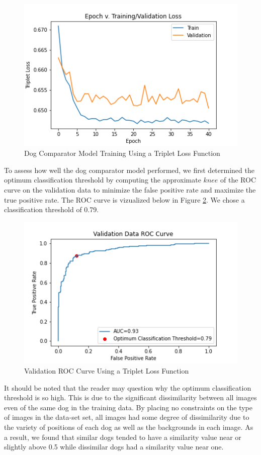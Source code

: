 \documentclass{article}
\begin{document}
\begin{enumerate}
\begin{figure}[h]
\centering
	\includegraphics[scale=0.7]{final-report-images/triplet_training.png}
\caption{Dog Comparator Model Training Using a Triplet Loss Function}
\label{fig:x epoch_v_map}
\end{figure}
To assess how well the dog comparator model performed, we first determined the optimum classification threshold by computing the approximate $knee$ of the ROC curve on the validation data to minimize the false positive rate and maximize the true positive rate.  The ROC curve is vizualized below in Figure \ref{fig:x val roc curve}.  We chose a classification threshold of 0.79.

\begin{figure}[h]
\centering
	\includegraphics[scale=0.7]{final-report-images/roc_curve_validation_triplet.png}
\caption{Validation ROC Curve Using a Triplet Loss Function}
\label{fig:x val roc curve}
\end{figure}

\noindent It should be noted that the reader may question why the optimum classification threshold is so high.  This is due to the significant dissimilarity between all images even of the same dog in the training data.  By placing no constraints on the type of images in the data-set set, all images had some degree of dissimilarity due to the variety of positions of each dog as well as the backgrounds in each image.  As a result, we found that similar dogs tended to have a similarity value near or slightly above 0.5 while dissimilar dogs had a similarity value near one.  


\end{enumerate}
\end{document}
